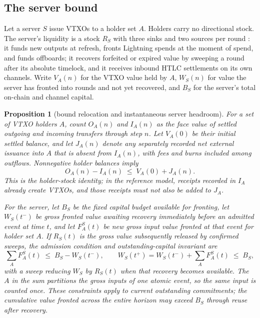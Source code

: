 \documentclass[11pt]{article}
\theoremstyle{plain}
\newtheorem{proposition}{Proposition}
\theoremstyle{definition}
\theoremstyle{remark}
\begin{document}
\subsection{The server bound}
\label{sec:server}

Let a server $S$ issue VTXOs to a holder set $A$. Holders carry no directional stock. The server's liquidity is a stock $R_S$ with three sinks and two sources per round \citep{second2025liquidity}: it funds new outputs at refresh, fronts Lightning spends at the moment of spend, and funds offboards; it recovers forfeited or expired value by sweeping a round after its absolute timelock, and it receives inbound HTLC settlements on its own channels. Write $V_A(n)$ for the VTXO value held by $A$, $W_S(n)$ for value the server has fronted into rounds and not yet recovered, and $B_S$ for the server's total on-chain and channel capital.

\begin{proposition}[bound relocation and instantaneous server headroom]
\label{prop:relocation}
For a set of VTXO holders $A$, count $O_A(n)$ and $I_A(n)$ as the
face value of \emph{settled} outgoing and incoming transfers through step $n$.
Let $V_A(0)$ be their initial settled balance, and let $J_A(n)$ denote
any separately recorded net external issuance into $A$ that is absent
from $I_A(n)$, with fees and burns included among outflows. Nonnegative
holder balances imply
\[
O_A(n)-I_A(n)\;\le\;V_A(0)+J_A(n).
\]
This is the holder-stock identity; in the reference model, receipts
recorded in $I_A$ already create VTXOs, and those receipts must not also
be added to $J_A$.

For the server, let $B_S$ be the fixed capital budget available for
\emph{fronting}, let $W_S(t^-)$ be gross fronted value awaiting recovery
immediately before an admitted event at time $t$, and let $F^S_A(t)$
be new gross input value fronted at that event for holder set $A$.
If $R_S(t)$ is the gross value subsequently released by confirmed sweeps,
the admission condition and outstanding-capital invariant are
\[
\sum_A F^S_A(t)\;\le\;B_S-W_S(t^-),\qquad
W_S(t^+)=W_S(t^-)+\sum_A F^S_A(t)\;\le\;B_S,
\]
with a sweep reducing $W_S$ by $R_S(t)$ when that recovery becomes
available. The $A$ in the sum partitions the gross inputs of one
atomic event, so the same input is counted once. These constraints
apply to current outstanding commitments; the cumulative value
fronted across the entire horizon may exceed $B_S$ through reuse
after recovery.
\end{proposition}
\end{document}
